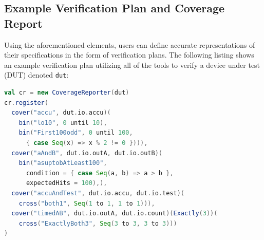\documentclass[conference]{IEEEtran}
\begin{document}
\subsection{Example Verification Plan and Coverage Report}%
Using the aforementioned elements, users can define accurate representations of their specifications in the form of verification plans. The following listing shows an example verification plan utilizing all of the tools to verify a device under test (DUT) denoted \texttt{dut}: 
\begin{lstlisting}[language=scala]
val cr = new CoverageReporter(dut)
cr.register(
  cover("accu", dut.io.accu)(
    bin("lo10", 0 until 10),
    bin("First100odd", 0 until 100,
      { case Seq(x) => x % 2 != 0 }))),
  cover("aAndB", dut.io.outA, dut.io.outB)(
    bin("asuptobAtLeast100", 
      condition = { case Seq(a, b) => a > b }, 
      expectedHits = 100),),
  cover("accuAndTest", dut.io.accu, dut.io.test)(
    cross("both1", Seq(1 to 1, 1 to 1))),
  cover("timedAB", dut.io.outA, dut.io.count)(Exactly(3))(
    cross("ExactlyBoth3", Seq(3 to 3, 3 to 3))) 
)
\end{lstlisting}
\end{document}
